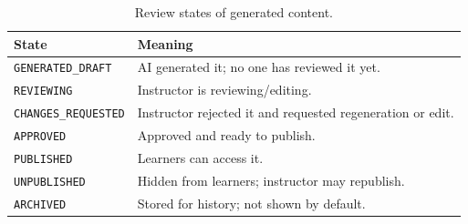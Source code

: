\begin{table}[H]
    \centering
    \caption{Review states of generated content.}
    \label{tab:review-states-appendix}
    \begin{tabular}{|p{4cm}|p{9.5cm}|}
        \hline
        \textbf{State} & \textbf{Meaning} \\
        \hline
        \texttt{GENERATED\_\allowbreak DRAFT}
            & AI generated it; no one has reviewed it yet. \\
        \hline
        \texttt{REVIEWING}
            & Instructor is reviewing/editing. \\
        \hline
        \texttt{CHANGES\_\allowbreak REQUESTED}
            & Instructor rejected it and requested regeneration or edit. \\
        \hline
        \texttt{APPROVED}
            & Approved and ready to publish. \\
        \hline
        \texttt{PUBLISHED}
            & Learners can access it. \\
        \hline
        \texttt{UNPUBLISHED}
            & Hidden from learners; instructor may republish. \\
        \hline
        \texttt{ARCHIVED}
            & Stored for history; not shown by default. \\
        \hline
    \end{tabular}
\end{table}
